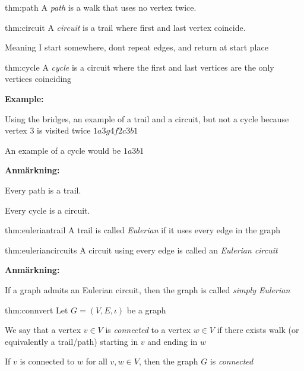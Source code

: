 \par\bigskip
\begin{theo}[Path]{thm:path}
  A \textit{path} is a walk that uses no vertex twice.
\end{theo}
\par\bigskip
\begin{theo}[Circuit]{thm:circuit}
  A \textit{circuit} is a trail where first and last vertex coincide.\par
  \noindent Meaning I start somewhere, dont repeat edges, and return at start place  
\end{theo}
\par\bigskip
\begin{theo}[Cycle]{thm:cycle}
  A \textit{cycle} is a circuit where the first and last vertices are the only vertices coinciding
\end{theo}
\par\bigskip
\noindent\textbf{Example:}\par
\noindent Using the bridges, an example of a trail and a circuit, but not a cycle because vertex 3 is visited twice $1a3g4f2c3b1$\par
\noindent An example of a cycle would be $1a3b1$
\par\bigskip
\noindent\textbf{Anmärkning:}\par
\noindent Every path is a trail.\par
\noindent Every cycle is a circuit.
\par\bigskip
\begin{theo}{thm:euleriantrail}
  A trail is called \textit{Eulerian} if it uses every edge in the graph
\end{theo}
\par\bigskip
\begin{theo}{thm:euleriancircuits}
  A circuit using every edge is called an \textit{Eulerian circuit}
\end{theo}
\par\bigskip
\noindent\textbf{Anmärkning:}\par
\noindent If a graph admits an Eulerian circuit, then the graph is called \textit{simply Eulerian} 
\par\bigskip
\begin{theo}{thm:connvert}
  Let $G = (V,E, \iota)$ be a graph\par
  \noindent We say that a vertex $v\in V$ is \textit{connected} to a vertex $w\in V$ if there exists walk (or equivalently a trail/path) starting in $v$ and ending in $w$
  \par\bigskip
  \noindent If $v$ is connected to $w$ for all $v,w\in V$, then the graph $G$ is \textit{connected}
\end{theo}
